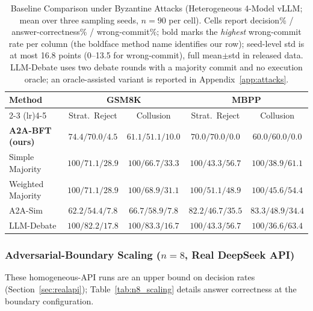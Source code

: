 \documentclass{article}
\begin{document}
\begin{table}[htbp]
\centering
\caption{Baseline Comparison under Byzantine Attacks (Heterogeneous 4-Model vLLM; mean over three sampling seeds, $n{=}90$ per cell). Cells report decision\% / answer-correctness\% / wrong-commit\%; bold marks the \emph{highest} wrong-commit rate per column (the boldface method name identifies our row); seed-level std is at most 16.8 points (0--13.5 for wrong-commit), full mean$\pm$std in released data. LLM-Debate uses two debate rounds with a majority commit and no execution oracle; an oracle-assisted variant is reported in Appendix~\ref{app:attacks}.}
\label{tab:hetero_compare}
\begin{tabular}{lcccc}
\toprule
\textbf{Method} & \multicolumn{2}{c}{\textbf{GSM8K}} & \multicolumn{2}{c}{\textbf{MBPP}} \\
\cmidrule(lr){2-3} \cmidrule(lr){4-5}
 & Strat.\ Reject & Collusion & Strat.\ Reject & Collusion \\
\midrule
\textbf{A2A-BFT (ours)} & $74.4/70.0/4.5$ & $61.1/51.1/10.0$ & $70.0/70.0/0.0$ & $60.0/60.0/0.0$ \\
Simple Majority & $100/71.1/\mathbf{28.9}$ & $100/66.7/\mathbf{33.3}$ & $100/43.3/\mathbf{56.7}$ & $100/38.9/61.1$ \\
Weighted Majority & $100/71.1/\mathbf{28.9}$ & $100/68.9/31.1$ & $100/51.1/48.9$ & $100/45.6/54.4$ \\
A2A-Sim & $62.2/54.4/7.8$ & $66.7/58.9/7.8$ & $82.2/46.7/35.5$ & $83.3/48.9/34.4$ \\
LLM-Debate & $100/82.2/17.8$ & $100/83.3/16.7$ & $100/43.3/\mathbf{56.7}$ & $100/36.6/\mathbf{63.4}$ \\
\bottomrule
\end{tabular}
\end{table}


\subsubsection{Adversarial-Boundary Scaling \texorpdfstring{($n{=}8$, Real DeepSeek API)}{(n=8, Real DeepSeek API)}}
These homogeneous-API runs are an upper bound on decision rates (Section~\ref{sec:realapi}); Table~\ref{tab:n8_scaling} details answer correctness at the boundary configuration.
\end{document}
